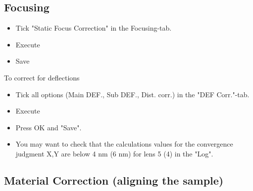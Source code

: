 \subsection{Focusing}
\label{sec:focusing}

\begin{itemize}
\item   Tick   "Static    Focus   Correction"   in   the
  Focusing-tab.
\item Execute
\item Save
\end{itemize}

To correct for deflections

\begin{itemize}
\item   Tick  all   options   (Main   DEF.,  Sub   DEF.,
  Dist. corr.) in the "DEF Corr."-tab.
\item Execute
\item Press OK and "Save".
\item You may want to check that the calculations values
  for the convergence judgment X,Y are below 4 nm (6 nm)
  for lens 5 (4) in the "Log".
\end{itemize}

\subsection{Material Correction (aligning the sample)}
\label{sec:material-correction}

